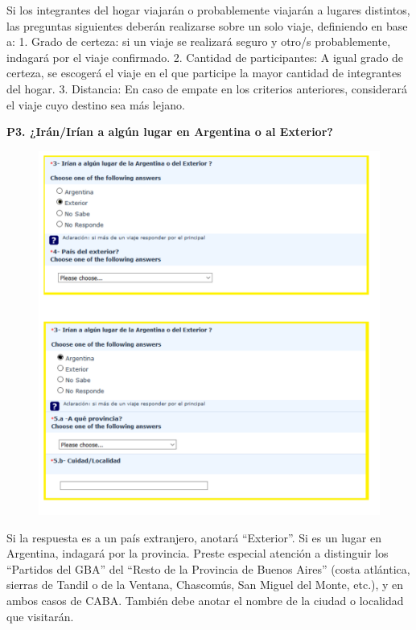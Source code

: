 \documentclass[
  openany]{book}
\begin{document}
Si los integrantes del hogar viajarán o probablemente viajarán a lugares distintos, las preguntas siguientes deberán realizarse sobre un solo viaje, definiendo en base a: 1. Grado de certeza: si un viaje se realizará seguro y otro/s probablemente, indagará por el viaje confirmado. 2. Cantidad de participantes: A igual grado de certeza, se escogerá el viaje en el que participe la mayor cantidad de integrantes del hogar. 3. Distancia: En caso de empate en los criterios anteriores, considerará el viaje cuyo destino sea más lejano.

\textbf{P3. ¿Irán/Irían a algún lugar en Argentina o al Exterior?}

\begin{figure}

{\centering \includegraphics[width=1\linewidth]{imagenes/figura6-140} 

}

\end{figure}

Si la respuesta es a un país extranjero, anotará ``Exterior''. Si es un lugar en Argentina, indagará por la provincia. Preste especial atención a distinguir los ``Partidos del GBA'' del ``Resto de la Provincia de Buenos Aires'' (costa atlántica, sierras de Tandil o de la Ventana, Chascomús, San Miguel del Monte, etc.), y en ambos casos de CABA. También debe anotar el nombre de la ciudad o localidad que visitarán.
\end{document}
